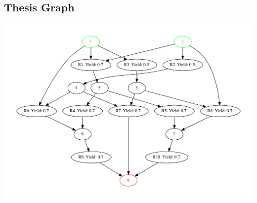 \documentclass[a4paper,10pt,titlepage]{paper}
\begin{document}
\subsection{Thesis Graph}
\centering
\includegraphics[scale=0.4]{TestGrafer/ThesisTest.pdf}
\label{Appendix::ThesisGraph}
\end{document}
